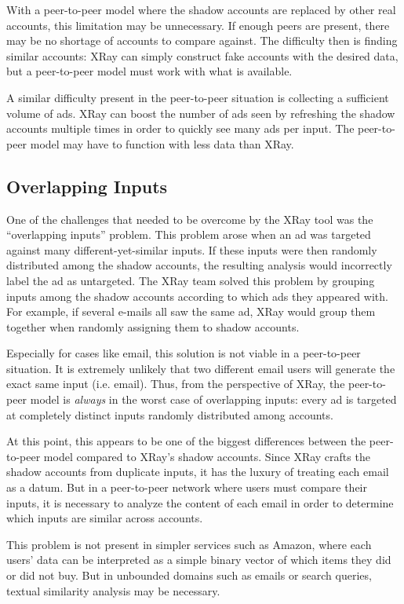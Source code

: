 \documentclass[12pt]{article}
\begin{document}
With a peer-to-peer model where the shadow accounts are replaced by other real
accounts, this limitation may be unnecessary. If enough peers are present, there
may be no shortage of accounts to compare against. The difficulty then is
finding similar accounts: XRay can simply construct fake accounts with the
desired data, but a peer-to-peer model must work with what is available.

A similar difficulty present in the peer-to-peer situation is collecting a
sufficient volume of ads. XRay can boost the number of ads seen by refreshing
the shadow accounts multiple times in order to quickly see many ads per input.
The peer-to-peer model may have to function with less data than XRay.

\subsection{Overlapping Inputs}\label{olap}

One of the challenges that needed to be overcome by the XRay tool was the
``overlapping inputs'' problem. This problem arose when an ad was targeted
against many different-yet-similar inputs. If these inputs were then randomly
distributed among the shadow accounts, the resulting analysis would incorrectly
label the ad as untargeted. The XRay team solved this problem by grouping inputs
among the shadow accounts according to which ads they appeared with. For
example, if several e-mails all saw the same ad, XRay would group them together
when randomly assigning them to shadow accounts.

Especially for cases like email, this solution is not viable in a peer-to-peer
situation. It is extremely unlikely that two different email users will generate
the exact same input (i.e. email). Thus, from the perspective of XRay, the
peer-to-peer model is {\it always} in the worst case of overlapping inputs:
every ad is targeted at completely distinct inputs randomly distributed among
accounts.

At this point, this appears to be one of the biggest differences between the
peer-to-peer model compared to XRay's shadow accounts. Since XRay crafts the
shadow accounts from duplicate inputs, it has the luxury of treating each email
as a datum. But in a peer-to-peer network where users must compare their inputs,
it is necessary to analyze the content of each email in order to determine which
inputs are similar across accounts.

This problem is not present in simpler services such as Amazon, where each
users' data can be interpreted as a simple binary vector of which items they did
or did not buy. But in unbounded domains such as emails or search queries,
textual similarity analysis may be necessary.
\end{document}
